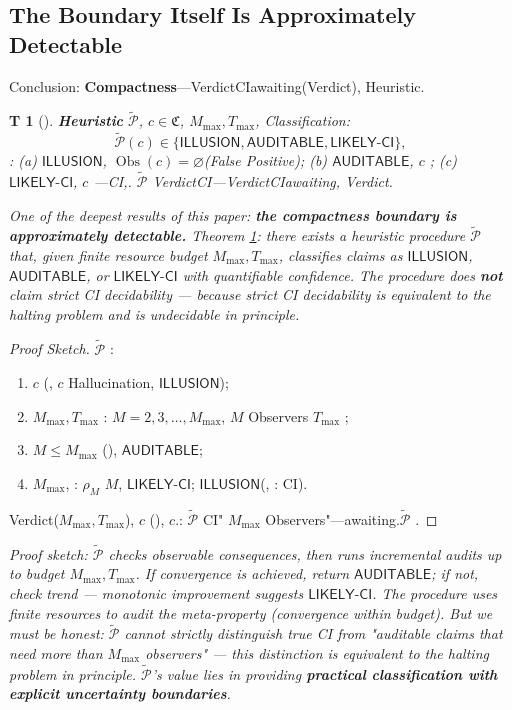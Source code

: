 \documentclass[12pt,a4paper]{article}
\theoremstyle{plain}
\newtheorem{theorem}Theorem[section]
\theoremstyle{definition}
\theoremstyle{remark}
\newcommand{\ClaimSpace}{\mathfrak{C}}
\newcommand{\Null}{\varnothing}
\DeclareMathOperator{\ObsSet}{Obs}
\begin{document}
\subsection{The Boundary Itself Is Approximately Detectable}
Conclusion: \textbf{Compactness}---VerdictCIawaiting(Verdict), Heuristic.
\begin{theorem}[]\label{thm:boundary_auditable}
\textbf{Heuristic} $\widetilde{\mathcal{P}}$, $c \in \ClaimSpace$, $M_{\max}, T_{\max}$, Classification:
\begin{equation}\label{eq:boundary_test}
 \widetilde{\mathcal{P}}(c) \in \{\mathsf{ILLUSION}, \mathsf{AUDITABLE}, \mathsf{LIKELY\text{-}CI}\},
\end{equation}
: (a) $\mathsf{ILLUSION}$, $\ObsSet(c) = \Null$(False Positive); (b) $\mathsf{AUDITABLE}$, $c$ ; (c) $\mathsf{LIKELY\text{-}CI}$, $c$ ---CI,. $\widetilde{\mathcal{P}}$ VerdictCI---VerdictCIawaiting, Verdict.
\end{theorem}
\vspace{4pt}
\noindent
\textit{One of the deepest results of this paper: \textbf{the compactness boundary is approximately detectable.} Theorem \ref{thm:boundary_auditable}: there exists a heuristic procedure $\widetilde{\mathcal{P}}$ that, given finite resource budget $M_{\max}, T_{\max}$, classifies claims as $\mathsf{ILLUSION}$, $\mathsf{AUDITABLE}$, or $\mathsf{LIKELY\text{-}CI}$ with quantifiable confidence. The procedure does \textbf{not} claim strict CI decidability --- because strict CI decidability is equivalent to the halting problem and is undecidable in principle.}
\begin{proof}[Proof Sketch]
 $\widetilde{\mathcal{P}}$ : 
\begin{enumerate}[label=(\arabic*)]
 \item $c$ (, $c$ Hallucination, $\mathsf{ILLUSION}$); 
 \item $M_{\max}, T_{\max}$ : $M = 2, 3, \dots, M_{\max}$, $M$ Observers $T_{\max}$ ; 
 \item $M \leq M_{\max}$ (), $\mathsf{AUDITABLE}$; 
 \item $M_{\max}$, : $\rho_M$ $M$, $\mathsf{LIKELY\text{-}CI}$; $\mathsf{ILLUSION}$(, : CI).
\end{enumerate}
Verdict($M_{\max}, T_{\max}$), $c$ \textit{}(), $c$.: $\widetilde{\mathcal{P}}$ CI" $M_{\max}$ Observers"---awaiting.$\widetilde{\mathcal{P}}$ \textit{}.
\end{proof}
\vspace{4pt}
\noindent
\textit{Proof sketch: $\widetilde{\mathcal{P}}$ checks observable consequences, then runs incremental audits up to budget $M_{\max}, T_{\max}$. If convergence is achieved, return $\mathsf{AUDITABLE}$; if not, check trend --- monotonic improvement suggests $\mathsf{LIKELY\text{-}CI}$. The procedure uses finite resources to audit the meta-property (convergence within budget). But we must be honest: $\widetilde{\mathcal{P}}$ cannot strictly distinguish true CI from "auditable claims that need more than $M_{\max}$ observers" --- this distinction is equivalent to the halting problem in principle. $\widetilde{\mathcal{P}}$'s value lies in providing \textbf{practical classification with explicit uncertainty boundaries}.}
\end{document}
